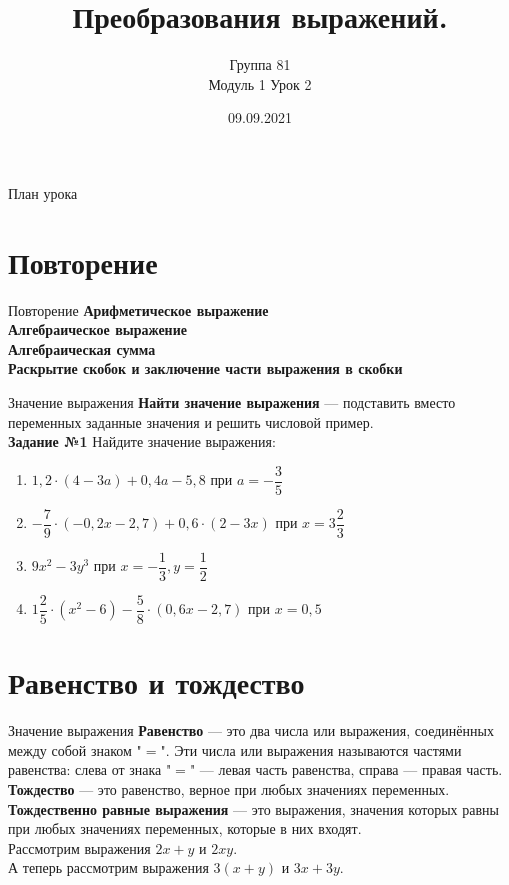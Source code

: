\documentclass[12pt, aspectratio=169]{beamer}
\title{Преобразования выражений.}
\subtitle{Группа 81 \\[8pt] Модуль 1 Урок 2}
\institute{Школа Симметрия}
\date{09.09.2021}
\begin{document}
\maketitle
\begin{frame}{План урока}
\end{frame}

\section{Повторение}

\begin{frame}{Повторение}
	\onslide<1->
	\textbf{Арифметическое выражение}\\
	\onslide<2->
	\textbf{Алгебраическое выражение}\\
	\onslide<3->
	\textbf{Алгебраическая сумма}\\
	\onslide<3->
	\textbf{Раскрытие скобок и заключение части выражения в скобки}\\
\end{frame}

\begin{frame}{Значение выражения}
	\onslide<1->
	\textbf{Найти значение выражения} — подставить вместо переменных заданные значения и решить числовой пример.\\[12pt]
	\textbf{Задание №1} Найдите значение выражения:
	\begin{enumerate}
		\item $1,2\cdot(4-3a)+0,4a-5,8$ при $a=-\dfrac{3}{5}$
		\item $-\dfrac{7}{9}\cdot(-0,2x-2,7)+0,6\cdot(2-3x)$ при $x=3\dfrac{2}{3}$
		\item $9x^2 - 3y^3$ при $x=-\dfrac{1}{3}, y=\dfrac{1}{2}$
		\item $1\dfrac{2}{5}\cdot(x^2-6)-\dfrac{5}{8}\cdot(0,6x-2,7)$ при $x=0,5$
	\end{enumerate}
\end{frame}

\section{Равенство и тождество}

\begin{frame}{Значение выражения}
	\onslide<1->
	\textbf{Равенство} — это два числа или выражения, соединённых между собой знаком "$=$". Эти числа или выражения называются частями равенства: слева от знака "$=$" — левая часть равенства, справа — правая часть.\\[12pt]
	\onslide<2->
	\textbf{Тождество} — это равенство, верное при любых значениях переменных.\\[12pt]
	\textbf{Тождественно равные выражения} — это выражения, значения которых равны при любых значениях переменных, которые в них входят.\\[12pt]
	\onslide<3->
	Рассмотрим выражения $2x+y$ и $2xy$.\\
	\onslide<4->
	А теперь рассмотрим выражения $3(x+y)$ и $3x+3y$.
\end{frame}
\end{document}
